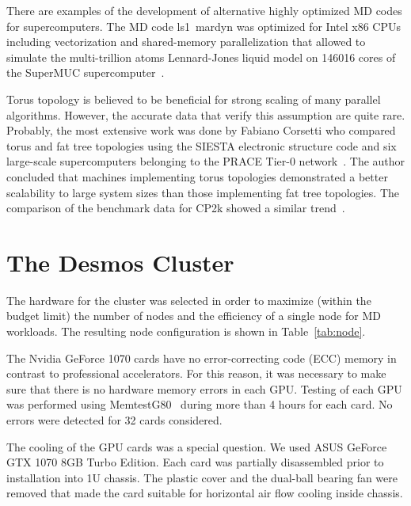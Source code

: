 \documentclass{llncs}
\begin{document}
There are examples of the development of alternative highly optimized MD codes for supercomputers. The MD code ls1~mardyn was optimized for Intel x86 CPUs including vectorization and shared-memory parallelization that allowed to simulate the multi-trillion atoms Lennard-Jones liquid model on 146016 cores of the SuperMUC supercomputer~\cite{MD-on-SuperMUC-2013}. 

Torus topology is believed to be beneficial for strong scaling of many parallel algorithms. However, the accurate data that verify this assumption are quite rare. Probably, the most extensive work was done by Fabiano Corsetti who compared torus and fat tree topologies using the SIESTA electronic structure code and six large-scale supercomputers belonging to the PRACE Tier-0
network~\cite{Corsetti2014}. The author concluded that machines implementing torus topologies demonstrated a better scalability to large system sizes than those implementing fat tree topologies. The comparison of the benchmark data for CP2k showed a similar trend~\cite{StegailovOrekhovSmirnov-PaCT2015}.


\section{The Desmos Cluster}

The hardware for the cluster was selected in order to maximize (within the budget limit) the number of nodes and the efficiency of a single node for MD workloads. The resulting node configuration is shown in Table~\ref{tab:node}.

The Nvidia GeForce 1070 cards have no error-correcting code (ECC) memory in contrast to professional accelerators. For this reason, it was necessary to make sure that there is no hardware memory errors in each GPU. Testing of each GPU was performed using MemtestG80~\cite{Haque:2010:HDS:1844765.1845231} during more than 4 hours for each card. No errors were detected for 32 cards considered.

The cooling of the GPU cards was a special question. We used ASUS GeForce GTX 1070 8GB Turbo Edition. Each card was partially disassembled prior to installation into 1U chassis. The plastic cover and the dual-ball bearing fan were removed that made the card suitable for horizontal air flow cooling inside chassis.
\end{document}
